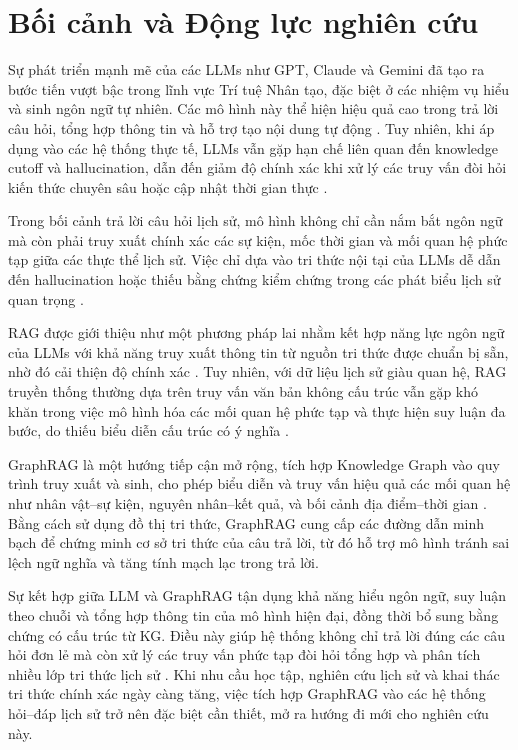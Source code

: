 \section{Bối cảnh và Động lực nghiên cứu}
Sự phát triển mạnh mẽ của các LLMs như GPT,
Claude và Gemini đã tạo ra bước tiến vượt bậc trong lĩnh vực Trí tuệ Nhân tạo, đặc biệt ở các nhiệm
vụ hiểu và sinh ngôn ngữ tự nhiên. Các mô hình này thể hiện hiệu quả cao trong trả lời câu hỏi, tổng
hợp thông tin và hỗ trợ tạo nội dung tự động \cite{gao2023retrieval}. Tuy nhiên, khi áp dụng vào các hệ
thống thực tế, LLMs vẫn gặp hạn chế liên quan đến knowledge cutoff và hallucination, dẫn đến giảm độ chính xác khi xử lý các truy vấn đòi hỏi kiến thức chuyên sâu hoặc
cập nhật thời gian thực \cite{gao2023retrieval, peng2024graph}.  

Trong bối cảnh trả lời câu hỏi lịch sử, mô hình không chỉ cần nắm bắt ngôn ngữ mà còn phải
truy xuất chính xác các sự kiện, mốc thời gian và mối quan hệ phức tạp giữa các thực thể lịch sử. Việc
chỉ dựa vào tri thức nội tại của LLMs dễ dẫn đến hallucination hoặc thiếu bằng chứng kiểm chứng trong
các phát biểu lịch sử quan trọng \cite{peng2024graph}.  

RAG được giới thiệu như một phương pháp lai nhằm kết hợp
năng lực ngôn ngữ của LLMs với khả năng truy xuất thông tin từ nguồn tri thức được chuẩn bị sẵn, nhờ đó cải
thiện độ chính xác \cite{gao2023retrieval, lewis2020rag}. Tuy nhiên, với dữ liệu lịch sử giàu quan hệ,
RAG truyền thống thường dựa trên truy vấn văn bản không cấu trúc vẫn gặp khó khăn trong việc mô
hình hóa các mối quan hệ phức tạp và thực hiện suy luận đa bước, do thiếu biểu diễn cấu trúc có ý nghĩa
\cite{peng2024graph}.  

GraphRAG là một hướng tiếp cận mở rộng, tích hợp Knowledge Graph vào quy trình truy
xuất và sinh, cho phép biểu diễn và truy vấn hiệu quả các mối quan hệ như nhân vật–sự kiện, nguyên
nhân–kết quả, và bối cảnh địa điểm–thời gian \cite{han2024retrieval, peng2024graph}. Bằng cách sử dụng đồ thị tri thức,
GraphRAG cung cấp các đường dẫn minh bạch để chứng minh cơ sở tri thức của câu trả lời, từ đó hỗ trợ
mô hình tránh sai lệch ngữ nghĩa và tăng tính mạch lạc trong trả lời.  

Sự kết hợp giữa LLM và GraphRAG tận dụng khả năng hiểu ngôn ngữ, suy luận theo chuỗi và
tổng hợp thông tin của mô hình hiện đại, đồng thời bổ sung bằng chứng có cấu trúc từ KG. Điều này
giúp hệ thống không chỉ trả lời đúng các câu hỏi đơn lẻ mà còn xử lý các truy vấn phức tạp đòi hỏi tổng
hợp và phân tích nhiều lớp tri thức lịch sử \cite{linders2025knowledge}. Khi nhu cầu học tập, nghiên cứu lịch sử và khai thác tri
thức chính xác ngày càng tăng, việc tích hợp GraphRAG vào các hệ thống hỏi–đáp lịch sử trở nên đặc
biệt cần thiết, mở ra hướng đi mới cho nghiên cứu này.

